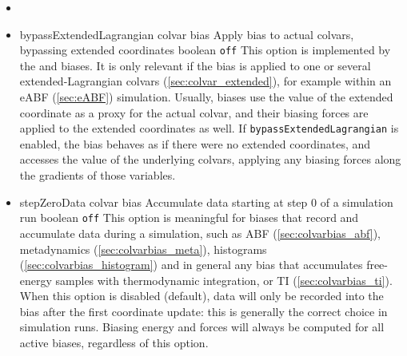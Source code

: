 \begin{itemize}
\item %

\item %
  \keydef
    {bypassExtendedLagrangian}{%
    colvar bias}{%
    Apply bias to actual colvars, bypassing extended coordinates}{%
    boolean}{%
    \texttt{off}}{%
    This option is implemented by the  and
     biases.
    It is only relevant if the bias is applied to one or several extended-Lagrangian colvars (\ref{sec:colvar_extended}),
    for example within an eABF (\ref{sec:eABF}) simulation.
    Usually, biases use the value of the extended coordinate as a proxy for the actual colvar, and their biasing forces are applied to the extended coordinates as well.
    If \texttt{bypassExtendedLagrangian} is enabled, the bias behaves as if there were no extended coordinates, and accesses the value of the underlying colvars, applying any biasing forces along the gradients of those variables.}

\item %
  \keydef
    {stepZeroData}{%
    colvar bias}{%
    Accumulate data starting at step 0 of a simulation run}{%
    boolean}{%
    \texttt{off}}{%
    This option is meaningful for biases that record and accumulate data during a simulation, such as ABF (\ref{sec:colvarbias_abf}), metadynamics (\ref{sec:colvarbias_meta}), histograms (\ref{sec:colvarbias_histogram}) and in general any bias that accumulates free-energy samples with thermodynamic integration, or TI (\ref{sec:colvarbias_ti}).
    When this option is disabled (default), data will only be recorded into the bias after the first coordinate update: this is generally the correct choice in simulation runs.
    Biasing energy and forces will always be computed for all active biases, regardless of this option.
  }

\end{itemize}


